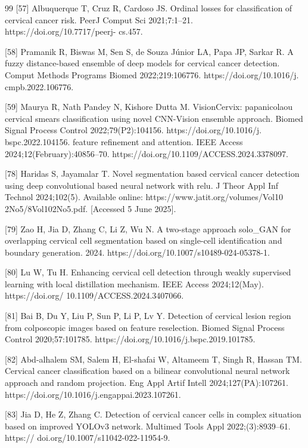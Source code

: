 \documentclass[final,5p,times,twocolumn,authoryear]{elsarticle}
\begin{document}
\begin{thebibliography}{99}
 [57] Albuquerque T, Cruz R, Cardoso JS. Ordinal losses for classification of cervical cancer risk. PeerJ Comput Sci 2021;7:1–21. https://doi.org/10.7717/peerj- cs.457.

 [58] Pramanik R, Biswas M, Sen S, de Souza Júnior LA, Papa JP, Sarkar R. A fuzzy distance-based ensemble of deep models for cervical cancer detection. Comput Methods Programs Biomed 2022;219:106776. https://doi.org/10.1016/j. cmpb.2022.106776.

 [59] Maurya R, Nath Pandey N, Kishore Dutta M. VisionCervix: papanicolaou cervical smears classification using novel CNN-Vision ensemble approach. Biomed Signal Process Control 2022;79(P2):104156. https://doi.org/10.1016/j. bspc.2022.104156. feature refinement and attention. IEEE Access 2024;12(February):40856–70. https://doi.org/10.1109/ACCESS.2024.3378097.

 [78] Haridas S, Jayamalar T. Novel segmentation based cervical cancer detection using deep convolutional based neural network with relu. J Theor Appl Inf Technol 2024;102(5). Available online: https://www.jatit.org/volumes/Vol10 2No5/8Vol102No5.pdf. [Accessed 5 June 2025].

 [79] Zao H, Jia D, Zhang C, Li Z, Wu N. A two-stage approach solo_GAN for overlapping cervical cell segmentation based on single-cell identification and boundary generation. 2024. https://doi.org/10.1007/s10489-024-05378-1.

 [80] Lu W, Tu H. Enhancing cervical cell detection through weakly supervised learning with local distillation mechanism. IEEE Access 2024;12(May). https://doi.org/ 10.1109/ACCESS.2024.3407066.

 [81] Bai B, Du Y, Liu P, Sun P, Li P, Lv Y. Detection of cervical lesion region from colposcopic images based on feature reselection. Biomed Signal Process Control 2020;57:101785. https://doi.org/10.1016/j.bspc.2019.101785.

 [82] Abd-alhalem SM, Salem H, El-shafai W, Altameem T, Singh R, Hassan TM. Cervical cancer classification based on a bilinear convolutional neural network approach and random projection. Eng Appl Artif Intell 2024;127(PA):107261. https://doi.org/10.1016/j.engappai.2023.107261.

 [83] Jia D, He Z, Zhang C. Detection of cervical cancer cells in complex situation based on improved YOLOv3 network. Multimed Tools Appl 2022;(3):8939–61. https:// doi.org/10.1007/s11042-022-11954-9.


\end{thebibliography}
\end{document}
